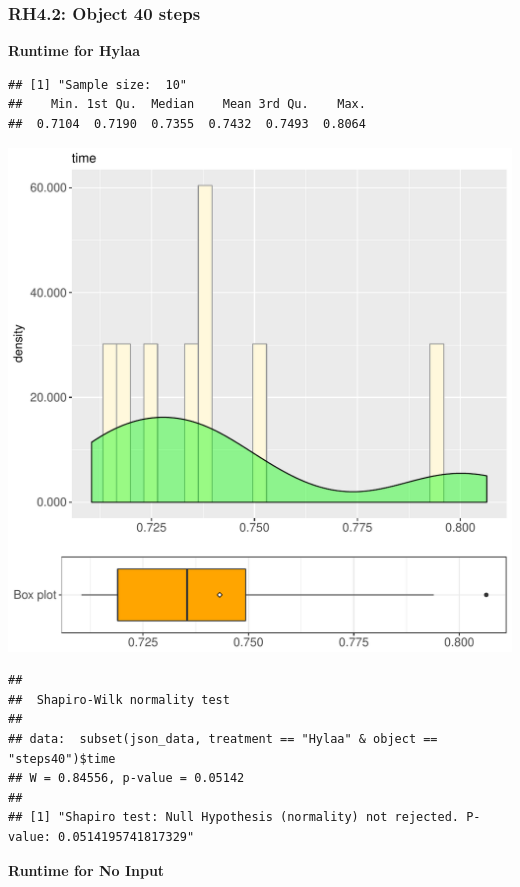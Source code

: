 \documentclass{article}\usepackage[]{graphicx}\usepackage[]{color}
\makeatletter
\def\maxwidth{ %
  \ifdim\Gin@nat@width>\linewidth
    \linewidth
  \else
    \Gin@nat@width
  \fi
}
\newenvironment{kframe}{%
 \def\at@end@of@kframe{}%
 \ifinner\ifhmode%
  \def\at@end@of@kframe{\end{minipage}}%
  \begin{minipage}{\columnwidth}%
 \fi\fi%
 \def\FrameCommand##1{\hskip\@totalleftmargin \hskip-\fboxsep
 \colorbox{shadecolor}{##1}\hskip-\fboxsep
     \hskip-\linewidth \hskip-\@totalleftmargin \hskip\columnwidth}%
 \MakeFramed {\advance\hsize-\width
   \@totalleftmargin\z@ \linewidth\hsize
   \@setminipage}}%
 {\par\unskip\endMakeFramed%
 \at@end@of@kframe}
\newenvironment{knitrout}{}{} %
\makeatother
\begin{document}
\subsubsection{RH4.2: Object 40 steps}

 \textbf{Runtime for Hylaa}
\begin{knitrout}
\color{fgcolor}\begin{kframe}
\begin{verbatim}
## [1] "Sample size:  10"
##    Min. 1st Qu.  Median    Mean 3rd Qu.    Max. 
##  0.7104  0.7190  0.7355  0.7432  0.7493  0.8064
\end{verbatim}
\end{kframe}
\includegraphics[width=\maxwidth]{figure/RH4_Hylaa_steps40-1} 
\begin{kframe}\begin{verbatim}
## 
## 	Shapiro-Wilk normality test
## 
## data:  subset(json_data, treatment == "Hylaa" & object == "steps40")$time
## W = 0.84556, p-value = 0.05142
## 
## [1] "Shapiro test: Null Hypothesis (normality) not rejected. P-value: 0.0514195741817329"
\end{verbatim}
\end{kframe}
\end{knitrout}
 \textbf{Runtime for No Input}
\end{document}
